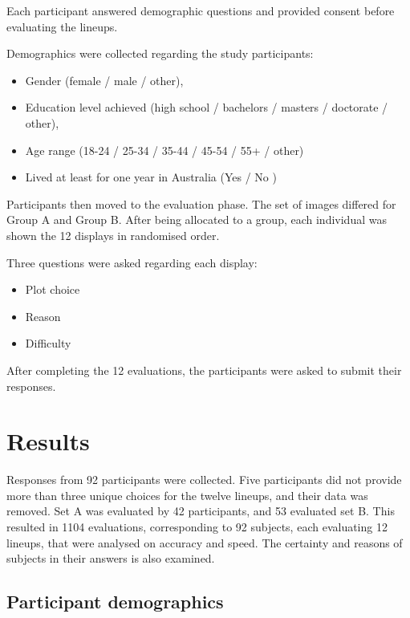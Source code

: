 \documentclass{monashthesis}
\begin{document}
Each participant answered demographic questions and provided consent before evaluating the lineups.

Demographics were collected regarding the study participants:

\begin{itemize}
\tightlist
\item
  Gender (female / male / other),
\item
  Education level achieved (high school / bachelors / masters / doctorate / other),
\item
  Age range (18-24 / 25-34 / 35-44 / 45-54 / 55+ / other)
\item
  Lived at least for one year in Australia (Yes / No )
\end{itemize}

Participants then moved to the evaluation phase.
The set of images differed for Group A and Group B.
After being allocated to a group, each individual was shown the 12 displays in randomised order.

Three questions were asked regarding each display:

\begin{itemize}
\tightlist
\item
  Plot choice
\item
  Reason
\item
  Difficulty
\end{itemize}

After completing the 12 evaluations, the participants were asked to submit their responses.

\hypertarget{results}{%
\section{Results}\label{results}}

Responses from 92 participants were collected. Five participants did not provide more than three unique choices for the twelve lineups, and their data was removed. Set A was evaluated by 42 participants, and 53 evaluated set B. This resulted in 1104 evaluations, corresponding to 92 subjects, each evaluating 12 lineups, that were analysed on accuracy and speed. The certainty and reasons of subjects in their answers is also examined.

\hypertarget{participant-demographics}{%
\subsection{Participant demographics}\label{participant-demographics}}
\end{document}
